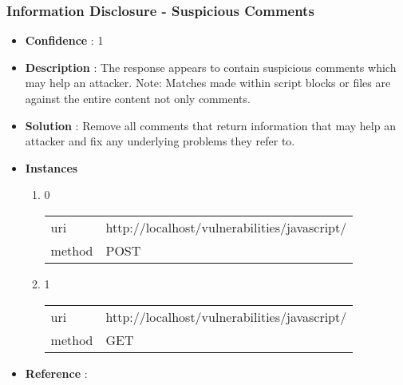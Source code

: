 \documentclass[10pt]{article}
\begin{document}
\subsubsection{Information Disclosure - Suspicious Comments}
\begin{itemize}
\item[] \textbf{Confidence} : 1
\item[] \textbf{Description} : The response appears to contain suspicious comments which may help an attacker. Note: Matches made within script blocks or files are against the entire content not only comments.
\item[] \textbf{Solution} :  Remove all comments that return information that may help an attacker and fix any underlying problems they refer to.
\item[] \textbf{Instances}
\begin{enumerate}
\item[] 0
\begin{tabular}{| l | p{14cm}}
uri & http://localhost/vulnerabilities/javascript/ \\
method & POST \\
\end{tabular}
\item[] 1
\begin{tabular}{| l | p{14cm}}
uri & http://localhost/vulnerabilities/javascript/ \\
method & GET \\
\end{tabular}
\end{enumerate}
\item[] \textbf{Reference} : 
\end{itemize}
\end{document}
